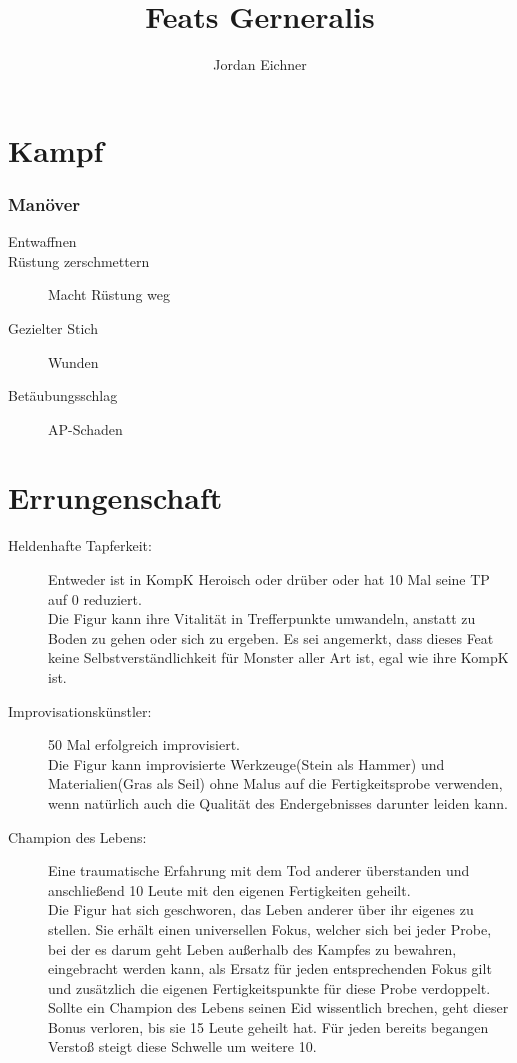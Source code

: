 \documentclass[a4paper,12pt,oneside]{book}
\author{Jordan Eichner}
\title{Feats Gerneralis}
\date{}
\begin{document}
\maketitle
\tableofcontents

\part{Kampf}

\section{Manöver}
\begin{description}
\item[Entwaffnen]
\item[Rüstung zerschmettern]Macht Rüstung weg
\item[Gezielter Stich]Wunden
\item[Betäubungsschlag]AP-Schaden
\end{description}

\part{Errungenschaft}

\begin{description}
\item[Heldenhafte Tapferkeit:] Entweder ist in KompK Heroisch oder drüber oder hat 10 Mal seine TP auf 0 reduziert.
\\Die Figur kann ihre Vitalität in Trefferpunkte umwandeln, anstatt zu Boden zu gehen oder sich zu ergeben. Es sei angemerkt, dass dieses Feat keine Selbstverständlichkeit für Monster aller Art ist, egal wie ihre KompK ist.
\item[Improvisationskünstler:] 50 Mal erfolgreich improvisiert.
\\Die Figur kann improvisierte Werkzeuge(Stein als Hammer) und Materialien(Gras als Seil) ohne Malus auf die Fertigkeitsprobe verwenden, wenn natürlich auch die Qualität des Endergebnisses darunter leiden kann.
\item[Champion des Lebens:] Eine traumatische Erfahrung mit dem Tod anderer überstanden und anschließend 10 Leute mit den eigenen Fertigkeiten geheilt.
\\Die Figur hat sich geschworen, das Leben anderer über ihr eigenes zu stellen. Sie erhält einen universellen Fokus, welcher sich bei jeder Probe, bei der es darum geht Leben außerhalb des Kampfes zu bewahren, eingebracht werden kann, als Ersatz für jeden entsprechenden Fokus gilt und zusätzlich die eigenen Fertigkeitspunkte für diese Probe verdoppelt. Sollte ein Champion des Lebens seinen Eid wissentlich brechen, geht dieser Bonus verloren, bis sie 15 Leute geheilt hat. Für jeden bereits begangen Verstoß steigt diese Schwelle um weitere 10.
\end{description}
\end{document}
